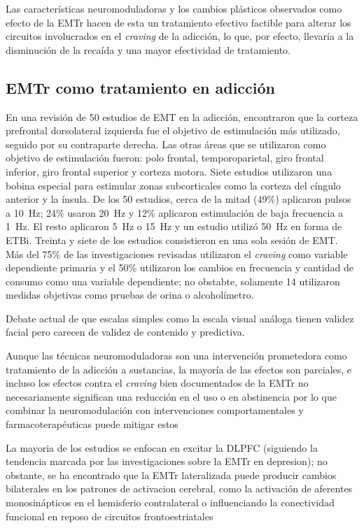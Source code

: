 Las características neuromoduladoras y los cambios plásticos observados como efecto de la EMTr hacen de esta un tratamiento efectivo factible para alterar los circuitos involucrados en el \textit{craving} de la adicción, lo que, por efecto, llevaría a la disminución de la recaída y una mayor efectividad de tratamiento.


\subsection{EMTr como tratamiento en adicción}
En una revisión de 50 estudios de EMT en la adicción, \textcite{Ekhtiari2018} encontraron que la corteza prefrontal dorsolateral izquierda fue el objetivo de estimulación más utilizado, seguido por su contraparte derecha. Las otras áreas que se utilizaron como objetivo de estimulación fueron: polo frontal, temporoparietal, giro frontal inferior, giro frontal superior y corteza motora. Siete estudios utilizaron una bobina especial para estimular zonas subcorticales como la corteza del cíngulo anterior y la ínsula. De los 50 estudios, cerca de la mitad (49\%) aplicaron pulsos a \SI{10}{\hertz}; 24\% usaron \SI{20}{\hertz} y 12\% aplicaron estimulación de baja frecuencia a \SI{1}{\hertz}. El resto aplicaron \SI{5}{\hertz} o \SI{15}{\hertz} y un estudio utilizó \SI{50}{\hertz} en forma de ETBi. Treinta y siete de los estudios consistieron en una sola sesión de EMT. Más del 75\% de las investigaciones revisadas utilizaron el \textit{craving} como variable dependiente primaria y el 50\% utilizaron los cambios en frecuencia y cantidad de consumo como una variable dependiente; no obstabte, solamente 14 utilizaron medidas objetivas como pruebas de orina o alcoholímetro.

Debate actual de que escalas simples como la escala visual análoga tienen validez facial pero carecen de validez de contenido y predictiva.

Aunque las técnicas neuromoduladoras son una intervención prometedora como tratamiento de la adicción a sustancias, la mayoría de las efectos son parciales, e incluso los efectos contra el \textit{craving} bien documentados de la EMTr no necesariamente significan una reducción en el uso o en abstinencia %
por lo que combinar la neuromodulación con intervenciones comportamentales y farmacoterapéuticas puede mitigar estos %

La mayoria de los estudios se enfocan en excitar la DLPFC (siguiendo la tendencia marcada por las investigaciones sobre la EMTr en depresion); no obstante, se ha encontrado que la EMTr lateralizada puede producir cambios bilaterales en los patrones de activacion cerebral, como la activación de aferentes monosinápticos en el hemisferio contralateral %
o influenciando la conectividad funcional en reposo de circuitos frontoestriatales %

